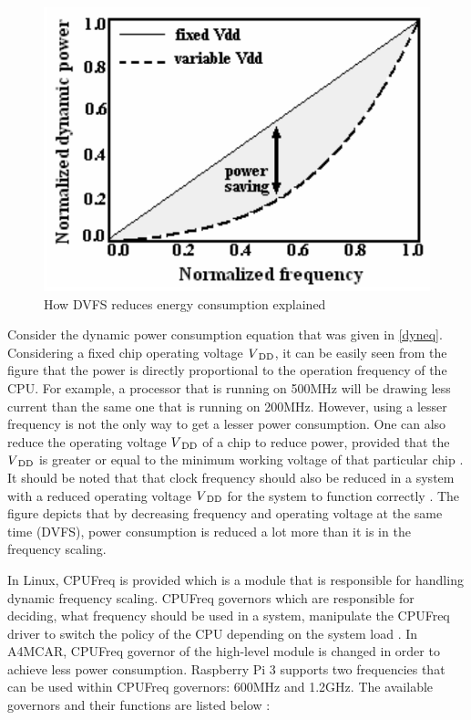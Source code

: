 \begin{figure}[!ht]
	\centering
	\captionsetup{justification=centering}
	\includegraphics[scale=0.40]{content/images/dvfsexplanation.png}
	\caption{How DVFS reduces energy consumption explained \cite{dvfspaper}}
	\label{fig:dvfsexplanation}
\end{figure}

Consider the dynamic power consumption equation that was given in \ref{dyneq}. Considering a fixed chip operating voltage ${V\textsubscript{DD}}$, it can be easily seen from the figure that the power is directly proportional to the operation frequency of the CPU. For example, a processor that is running on 500MHz will be drawing less current than the same one that is running on 200MHz. However, using a lesser frequency is not the only way to get a lesser power consumption. One can also reduce the operating voltage ${V\textsubscript{DD}}$ of a chip to reduce power, provided that the ${V\textsubscript{DD}}$ is greater or equal to the minimum working voltage of that particular chip \cite{dvfspaper}. It should be noted that that clock frequency should also be reduced in a system with a reduced operating voltage ${V\textsubscript{DD}}$ for the system to function correctly \cite{dvfspaper2}. The figure depicts that by decreasing frequency and operating voltage at the same time (DVFS), power consumption is reduced a lot more than it is in the frequency scaling.

In Linux, CPUFreq \cite{cpufrequencyscaling} is provided which is a module that is responsible for handling dynamic frequency scaling. CPUFreq governors which are responsible for deciding, what frequency should be used in a system, manipulate the CPUFreq driver to switch the policy of the CPU depending on the system load \cite{cpufrequencyscaling}. In A4MCAR, CPUFreq governor of the high-level module is changed in order to achieve less power consumption. Raspberry Pi 3 supports two frequencies that can be used within CPUFreq governors: 600MHz and 1.2GHz. The available governors and their functions are listed below \cite{gateworks}:

